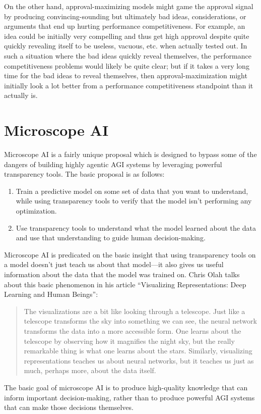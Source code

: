 \documentclass[
  onecolumn,
  natbib,
]{miri-tech-article}
\begin{document}
On the other hand, approval-maximizing models might game the approval signal by producing convincing-sounding but ultimately bad ideas, considerations, or arguments that end up hurting performance competitiveness. For example, an idea could be initially very compelling and thus get high approval despite quite quickly revealing itself to be useless, vacuous, etc. when actually tested out. In such a situation where the bad ideas quickly reveal themselves, the performance competitiveness problems would likely be quite clear; but if it takes a very long time for the bad ideas to reveal themselves, then approval-maximization might initially look a lot better from a performance competitiveness standpoint than it actually is.

\section{Microscope AI}
\label{sec:5}

Microscope AI is a fairly unique proposal which is designed to bypass some of the dangers of building highly agentic AGI systems by leveraging powerful transparency tools.\cite{chris_olah} The basic proposal is as follows:

\begin{enumerate}
\item Train a predictive model on some set of data that you want to understand, while using transparency tools to verify that the model isn't performing any optimization.
\item Use transparency tools to understand what the model learned about the data and use that understanding to guide human decision-making.
\end{enumerate}
Microscope AI is predicated on the basic insight that using transparency tools on a model doesn't just teach us about that model---it also gives us useful information about the data that the model was trained on. Chris Olah talks about this basic phenomenon in his article ``Visualizing Representations: Deep Learning and Human Beings'':\cite{visualizing}

\begin{quote}
    The visualizations are a bit like looking through a telescope. Just like a telescope transforms the sky into something we can see, the neural network transforms the data into a more accessible form. One learns about the telescope by observing how it magnifies the night sky, but the really remarkable thing is what one learns about the stars. Similarly, visualizing representations teaches us about neural networks, but it teaches us just as much, perhaps more, about the data itself.
\end{quote}
The basic goal of microscope AI is to produce high-quality knowledge that can inform important decision-making, rather than to produce powerful AGI systems that can make those decisions themselves.
\end{document}
